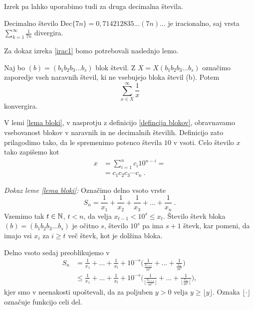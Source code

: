 \documentclass[twoside,11pt]{article}
\begin{document}
Izrek pa lahko uporabimo tudi za druga decimalna števila.

\begin{zgled}
    Decimalno število $\text{Dec}\{7n\} = 0{,}714212835\dots (7n) \dots$ je iracionalno, saj
    vrsta $\sum_{k=1}^{\infty}\frac{1}{7n} $ divergira.
\end{zgled}

Za dokaz izreka \ref{irac1} bomo potrebovali naslednjo lemo.

\begin{lema}\label{lema bloki}
    Naj bo $(b) = (b_1b_2b_3 \dots b_s)$ blok števil. Z $X = X(b_1b_2b_3 \dots b_s)$ označimo
    zaporedje vseh naravnih števil, ki ne vsebujejo bloka števil (b). Potem 
    \[ \sum_{x \in X}^{\infty} \frac{1}{x}\] konvergira.
\end{lema}

\begin{opomba}
    V lemi \ref{lema bloki}, v nasprotju z definicijo \ref{defincija blokov}, obravnavamo vsebovanost blokov v naravnih
    in ne decimalnih številih. Definicijo zato prilagodimo tako, da le spremenimo potenco števila
    $10$ v vsoti. Celo število $x$ tako zapišemo kot 
    \[ 
        \begin{split}
            x & = \sum^n_{i=1} c_i 10^{n-i} = \\
            & = c_1c_2c_3 \cdots c_n \ .
        \end{split} \]
\end{opomba}

\noindent
{\em Dokaz leme \ref{lema bloki}:\/} 
Označimo delno vsoto vrste 
\[ S_n = \frac{1}{x_1} + \frac{1}{x_2} + \frac{1}{x_3} + \dots + \frac{1}{x_n} \ . \]
Vzemimo tak $t \in \mathbb{N} $, $t < n$, da velja $x_{t-1} < 10^s \leq x_t$. Število števk bloka $(b) = (b_1b_2b_3 \dots b_s)$
je očitno $s$, število $10^s$ pa ima $s+1$ števk, kar pomeni, da imajo vsi $x_i$ za $i \geq t$
več števk, kot je dolžina bloka. 

Delno vsoto sedaj preoblikujemo v
\[ 
    \begin{split}
        S_n &= \frac{1}{x_1} + \dots + \frac{1}{x_t} + 10^{-s}\bigg(\frac{1}{\frac{x_{t + 1}}{10^s}} + \dots + \frac{1}{\frac{x_n}{10^s}}\bigg) \\
        &\leq \frac{1}{x_1} + \dots + \frac{1}{x_t} + 10^{-s}\bigg(\frac{1}{ \lfloor\frac{x_{t + 1}}{10^s}\rfloor} + \dots + \frac{1}{\lfloor\frac{x_n}{10^s}\rfloor}\bigg) ,
    \end{split}
     \]
kjer smo v neenakosti upoštevali, da za poljuben $y > 0$ velja $y \geq \lfloor y \rfloor$.
Oznaka $\lfloor \cdot \rfloor$ označuje funkcijo celi del.
\end{document}
